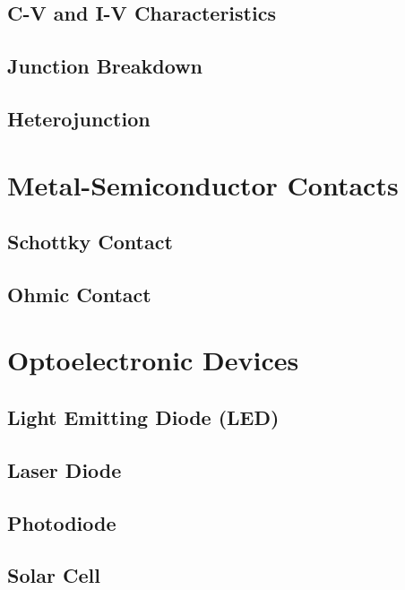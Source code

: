 \documentclass{article}
\begin{document}
	    \subsection{C-V and I-V Characteristics}
	
    	\subsection{Junction Breakdown}
	
    	\subsection{Heterojunction}
    	
	\section{Metal-Semiconductor Contacts}
	
	    \subsection{Schottky Contact}
	    
	    \subsection{Ohmic Contact}
	    
	\section{Optoelectronic Devices}
	
	    \subsection{Light Emitting Diode (LED)}
	    
	    \subsection{Laser Diode}
	    
	    \subsection{Photodiode}
	    
	    \subsection{Solar Cell}
	    
	
\end{document}
